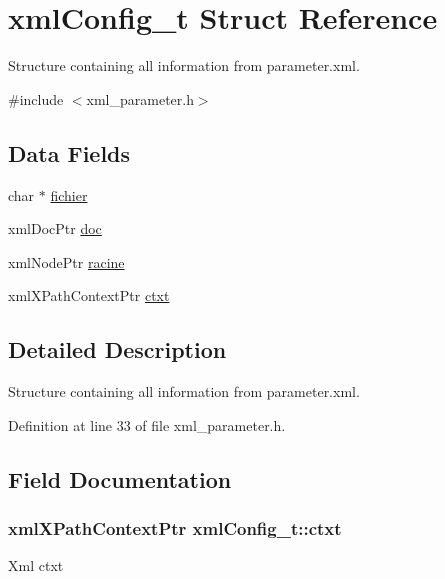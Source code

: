 \hypertarget{structxmlConfig__t}{
\section{xmlConfig\_\-t Struct Reference}
\label{structxmlConfig__t}
}


Structure containing all information from parameter.xml.  




{\ttfamily \#include $<$xml\_\-parameter.h$>$}

\subsection*{Data Fields}
\begin{DoxyCompactItemize}
\item 
char $\ast$ \hyperlink{structxmlConfig__t_a7a2f1cbf9d3b49f1b2debb85a8606658}{fichier}
\item 
xmlDocPtr \hyperlink{structxmlConfig__t_a35e7e8fc3398d0866fbf91b0245fd7b9}{doc}
\item 
xmlNodePtr \hyperlink{structxmlConfig__t_a535cd8a3e33d4ae2a00ab29f32a442ff}{racine}
\item 
xmlXPathContextPtr \hyperlink{structxmlConfig__t_ae21311533cb59c9752bf21ffce5d5316}{ctxt}
\end{DoxyCompactItemize}


\subsection{Detailed Description}
Structure containing all information from parameter.xml. 

Definition at line 33 of file xml\_\-parameter.h.



\subsection{Field Documentation}
\hypertarget{structxmlConfig__t_ae21311533cb59c9752bf21ffce5d5316}{
\subsubsection[{ctxt}]{\setlength{\rightskip}{0pt plus 5cm}xmlXPathContextPtr {\bf xmlConfig\_\-t::ctxt}}}
\label{structxmlConfig__t_ae21311533cb59c9752bf21ffce5d5316}
Xml ctxt 

